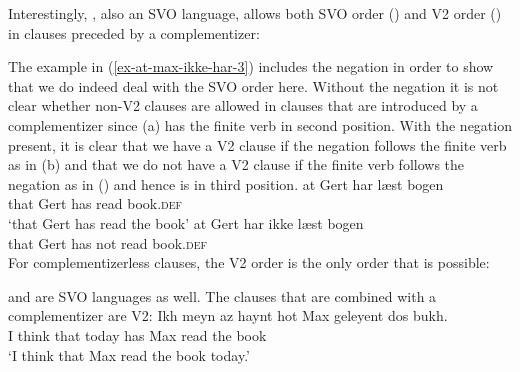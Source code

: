 \noindent
Interestingly, , also an SVO language, allows both SVO order () and V2 order () in clauses
preceded by a complementizer:
\z

\eal
{}
\zl
The example in (\ref{ex-at-max-ikke-har-3}) includes the negation in order to show that we do indeed deal
with the SVO order here. Without the negation it is not clear whether non-V2 clauses are allowed in
clauses that are introduced by a complementizer since (a) has the finite verb in second
position. With the negation present, it is clear that we have a V2 clause if the negation follows
the finite verb as in (b) and that we do not have a V2 clause if the finite verb follows the negation as in
() and hence is in third position.
\eal
\settowidth{}
\ex 
\gll at Gert har læst bogen\\
     that Gert has read book.\textsc{def}\\
\glt `that Gert has read the book'
\ex 
\gll at   Gert har ikke læst bogen\\
     that Gert has not  read book.\textsc{def}\\
\zl 
For complementizerless clauses, the V2 order is the only order that is possible:
\eal
\settowidth{}
\zl 

\noindent
{} and  are SVO languages as well. The clauses that are combined with a
complementizer are V2:
\eal
\ex
\gll Ikh meyn  az   haynt hot Max geleyent dos bukh.\footnotemark\\
     I think that today has Max read the book\\\yiddish
{}
\glt `I think that Max read the book today.'

